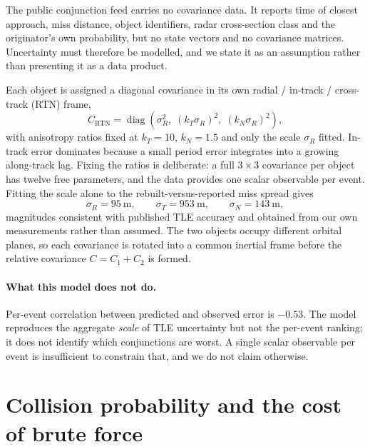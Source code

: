 \documentclass[11pt]{article}
\begin{document}
The public conjunction feed carries no covariance data. It reports time of
closest approach, miss distance, object identifiers, radar cross-section
class and the originator's own probability, but no state vectors and no
covariance matrices. Uncertainty must therefore be modelled, and we state it
as an assumption rather than presenting it as a data product.

Each object is assigned a diagonal covariance in its own radial /
in-track / cross-track (RTN) frame,
\begin{equation}
  C_{\text{RTN}} = \operatorname{diag}\!\left(\sigma_R^2,\;
    (k_T\sigma_R)^2,\; (k_N\sigma_R)^2\right),
  \label{eq:cov}
\end{equation}
with anisotropy ratios fixed at $k_T = 10$, $k_N = 1.5$ and only the scale
$\sigma_R$ fitted. In-track error dominates because a small period error
integrates into a growing along-track lag. Fixing the ratios is deliberate:
a full $3\times3$ covariance per object has twelve free parameters, and the
data provides one scalar observable per event. Fitting the scale alone to
the rebuilt-versus-reported miss spread gives
\begin{equation*}
  \sigma_R = \SI{95}{\meter}, \qquad
  \sigma_T = \SI{953}{\meter}, \qquad
  \sigma_N = \SI{143}{\meter},
\end{equation*}
magnitudes consistent with published TLE accuracy and obtained from our own
measurements rather than assumed. The two objects occupy different orbital
planes, so each covariance is rotated into a common inertial frame before
the relative covariance $C = C_1 + C_2$ is formed.

\paragraph{What this model does not do.} Per-event correlation between
predicted and observed error is $-0.53$. The model reproduces the aggregate
\emph{scale} of TLE uncertainty but not the per-event ranking; it does not
identify which conjunctions are worst. A single scalar observable per event
is insufficient to constrain that, and we do not claim otherwise.

\section{Collision probability and the cost of brute force}\label{sec:cost}
\end{document}
